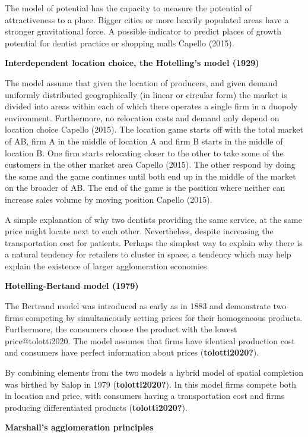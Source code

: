 \documentclass[
  10,
  a4paper,
]{article}
\begin{document}
The model of potential has the capacity to measure the potential of
attractiveness to a place. Bigger cities or more heavily populated areas
have a stronger gravitational force. A possible indicator to predict
places of growth potential for dentist practice or shopping malls
Capello (2015).

\textbf{Interdependent location choice, the Hotelling's model (1929)}

The model assume that given the location of producers, and given demand
uniformly distributed geographically (in linear or circular form) the
market is divided into areas within each of which there operates a
single firm in a duopoly environment. Furthermore, no relocation costs
and demand only depend on location choice Capello (2015). The location
game starts off with the total market of AB, firm A in the middle of
location A and firm B starts in the middle of location B. One firm
starts relocating closer to the other to take some of the customers in
the other market area Capello (2015). The other respond by doing the
same and the game continues until both end up in the middle of the
market on the broader of AB. The end of the game is the position where
neither can increase sales volume by moving position Capello (2015).

A simple explanation of why two dentists providing the same service, at
the same price might locate next to each other. Nevertheless, despite
increasing the transportation cost for patients. Perhaps the simplest
way to explain why there is a natural tendency for retailers to cluster
in space; a tendency which may help explain the existence of larger
agglomeration economies.

\textbf{Hotelling-Bertand model (1979)}

The Bertrand model was introduced as early as in 1883 and demonstrate
two firms competing by simultaneously setting prices for their
homogeneous products. Furthermore, the consumers choose the product with
the lowest price@tolotti2020. The model assumes that firms have
identical production cost and consumers have perfect information about
prices (\textbf{tolotti2020?}).

By combining elements from the two models a hybrid model of spatial
completion was birthed by Salop in 1979 (\textbf{tolotti2020?}). In this
model firms compete both in location and price, with consumers having a
transportation cost and firms producing differentiated products
(\textbf{tolotti2020?}).

\textbf{Marshall's agglomeration principles}
\end{document}
